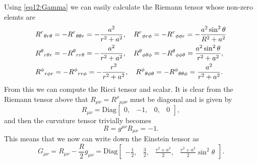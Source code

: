 \documentclass[11pt,a4paper, 
swedish, english %
]{article}
\begin{document}

Using \eqref{eq12:Gamma} we can easily calculate the Riemann tensor
whose non-zero elemts are
\begin{equation}
\begin{aligned}
&{R^r}_{\theta r\theta}=-{R^r}_{\theta\theta r}
=-\frac{a^2}{r^2+a^2} \qc
{R^r}_{\phi r\phi}=-{R^r}_{\phi\phi r}
=-\frac{a^2\sin^2\theta}{R^2+a^2}\\
&{R^\theta}_{r\theta r}=-{R^\theta}_{rr\theta}
=-\frac{a^2}{r^2+a^2}\qc
{R^\theta}_{\phi\theta\phi}=-{R^\theta}_{\phi\phi\theta}
=\frac{a^2\sin^2\theta}{r^2+a^2},\\
&{R^\phi}_{r\phi r}=-{R^\phi}_{rr\phi}
=-\frac{r^2}{r^2+a^2}\qc
{R^\phi}_{\theta\phi\theta}=-{R^\phi}_{\theta\theta\phi}
=\frac{a^2}{r^2+a^2}.
\end{aligned}
\end{equation}
From this we can compute the Ricci tensor and scalar. It is clear from
the Riemann tensor above that $R_{\mu\nu}={R^\rho}_{\mu\rho\nu}$ must
be diagonal and is given by
\begin{equation}
R_{\mu\nu}=\text{Diag}
\begin{bmatrix}
0,& -1,& 0, &0
\end{bmatrix},
\end{equation}
and then the curvature tensor trivially becomes
\begin{equation}
R=g^{\mu\nu}R_{\mu\nu}=-1.
\end{equation}
This means that we now can write down the Einstein tensor as
\begin{equation}
G_{\mu\nu}=R_{\mu\nu}-\frac{R}{2}g_{\mu\nu}
=\text{Diag}
\begin{bmatrix}
-\frac{1}{2},& \frac{3}{2},& \frac{r^2+a^2}{2},
&\frac{r^2+a^2}{2}\sin^2\theta
\end{bmatrix}.
\end{equation}






\end{document}
